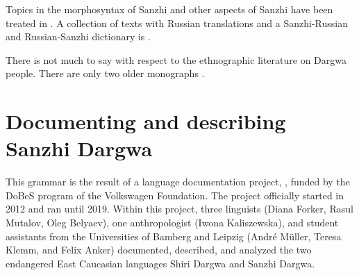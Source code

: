 Topics in the morphosyntax of Sanzhi and other aspects of Sanzhi have been treated in \citet{Forker2016a, Forker2014, Forker2019, ForkerSubmitteda, ForkerSubmittedb, ForkerSubmittedc}. A collection of texts with Russian translations and a Sanzhi-Russian and Russian-Sanzhi dictionary is \citet{Forker.Gadzhimuradov2017}.

There is not much to say with respect to the ethnographic literature on Dargwa people. There are only two older monographs \citep{Schilling1949, Gadzieva.etal1967}.



\section{Documenting and describing Sanzhi Dargwa}\label{sec:Documenting and describing Sanzhi Dargwa}\largerpage

This grammar is the result of a language documentation project, , funded by the DoBeS program of the Volkswagen Foundation. The project officially started in 2012 and ran until 2019. Within this project, three linguists (Diana Forker, Rasul Mutalov, Oleg Belyaev), one anthropologist (Iwona Kaliszewska), and student assistants from the Universities of Bamberg and Leipzig (André M{\"u}ller, Teresa Klemm, and Felix Anker) documented, described, and analyzed the two endangered East Caucasian languages Shiri Dargwa and Sanzhi Dargwa.


